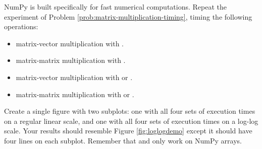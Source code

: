 \begin{problem} %
NumPy is built specifically for fast numerical computations.
Repeat the experiment of Problem \ref{prob:matrix-multiplication-timing}, timing the following operations:
%
\begin{itemize}
\item matrix-vector multiplication with .
\item matrix-matrix multiplication with .
\item matrix-vector multiplication with  or .
\item matrix-matrix multiplication with  or .
\end{itemize}

Create a single figure with two subplots: one with all four sets of execution times on a regular linear scale, and one with all four sets of execution times on a log-log scale.
Your results should resemble Figure \ref{fig:loglogdemo} except it should have four lines on each subplot. Remember that  and  only work on NumPy arrays.
\label{prob:numpy-is-awesome}
\end{problem}

